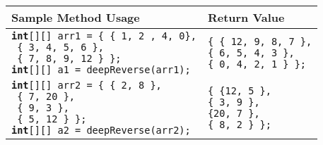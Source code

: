 \documentclass[12pt]{article}
\begin{document}
\noindent\begin{center}
\small
\begin{tabular}{| l | l |}
\hline\rule{0pt}{4ex}
Sample Method Usage & Return Value\\
\hline\rule{0pt}{5ex}
\makecell[l]{\texttt{\textbf{int}[][] arr1 = \{ \{ 1, 2 , 4, 0\},}\\ \hspace*{3.3cm}\texttt{ \{ 3, 4, 5, 6 \},}\\ \hspace*{3.3cm}\texttt{ \{ 7, 8, 9, 12 \} \};}\\ \texttt{\textbf{int}[][] a1 = deepReverse(arr1);} } & \makecell[l]{\texttt{\{ \{ 12, 9, 8, 7 \},}\\ \hspace*{0.4cm}\texttt{\{ 6, 5, 4, 3 \},}\\ \hspace*{0.4cm}\texttt{\{ 0, 4, 2, 1 \} \};} }\\
\hline\rule{0pt}{5ex}
\makecell[l]{\texttt{\textbf{int}[][] arr2 = \{ \{ 2, 8 \},}\\ \hspace*{2.6cm}\texttt{ \{ 7, 20 \}, }\\ \hspace*{2.6cm}\texttt{ \{ 9, 3 \}, }\\ \hspace*{2.6cm}\texttt{ \{ 5, 12 \} \}; }\\ \texttt{\textbf{int}[][] a2 = deepReverse(arr2);} } & \makecell[l]{\texttt{\{ \{12, 5 \},}\\ \hspace*{0.4cm}\texttt{\{ 3, 9 \},}\\ \hspace*{0.4cm}\texttt{\{20, 7 \},}\\ \hspace*{0.4cm}\texttt{\{ 8, 2 \} \};} }\\
\hline
\end{tabular}
\end{center}
\end{document}
